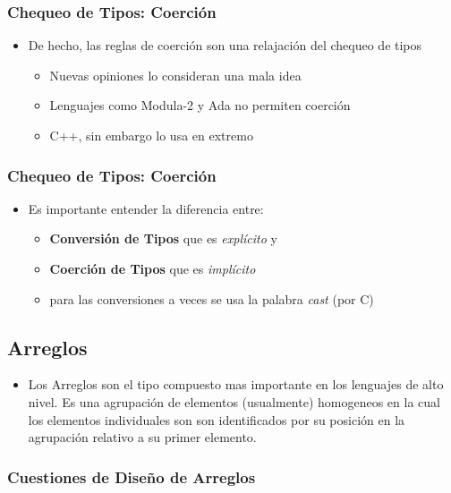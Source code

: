 \documentclass[11pt]{article}
\begin{document}
\subsubsection*{Chequeo de Tipos: Coerción}
\label{sec:orgheadline10}
\begin{itemize}
\item De hecho, las reglas de coerción son una relajación del chequeo de tipos
\begin{itemize}
\item Nuevas opiniones lo consideran una mala idea
\item Lenguajes como Modula-2 y Ada no permiten coerción
\item C++, sin embargo lo usa en extremo
\end{itemize}
\end{itemize}

\subsubsection*{Chequeo de Tipos: Coerción}
\label{sec:orgheadline11}
\begin{itemize}
\item Es importante entender la diferencia entre:
\begin{itemize}
\item \textbf{Conversión de Tipos} que es \emph{explícito} y
\item \textbf{Coerción de Tipos} que es \emph{implícito}
\item para las conversiones a veces se usa la palabra \emph{cast} (por C)
\end{itemize}
\end{itemize}


\subsection*{Arreglos}
\label{sec:orgheadline30}
\begin{itemize}
\item Los Arreglos son el tipo compuesto mas importante en los lenguajes
de alto nivel. Es una agrupación de elementos (usualmente) homogeneos
 en la cual los elementos individuales son son
identificados por su posición en la agrupación relativo a su primer
elemento.
\end{itemize}

\subsubsection*{Cuestiones de Diseño de Arreglos}
\label{sec:orgheadline13}
\end{document}
